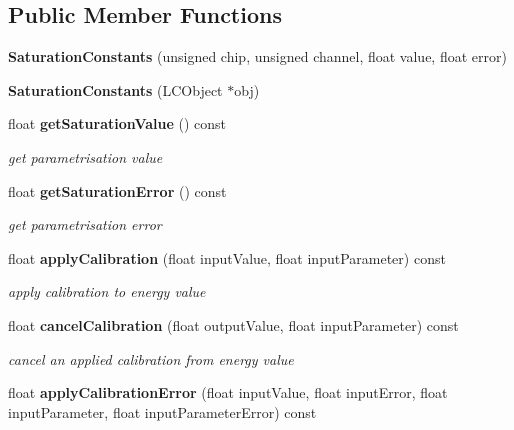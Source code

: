 \subsection*{Public Member Functions}
\begin{DoxyCompactItemize}
\item 
{\bfseries SaturationConstants} (unsigned chip, unsigned channel, float value, float error)\label{classCALICE_1_1SaturationConstants_ab78ca41a50dc74eddb2b82274dda4b96}

\item 
{\bfseries SaturationConstants} (LCObject $\ast$obj)\label{classCALICE_1_1SaturationConstants_a327dd2cc0ea1c5d5160e6693593d6587}

\item 
float {\bf getSaturationValue} () const \label{classCALICE_1_1SaturationConstants_a692c4d27fbada5699cb12c91c38653ab}

\begin{DoxyCompactList}\small\item\em get parametrisation value \item\end{DoxyCompactList}\item 
float {\bf getSaturationError} () const \label{classCALICE_1_1SaturationConstants_a9079460ba4174a3f95d12b0b647af98b}

\begin{DoxyCompactList}\small\item\em get parametrisation error \item\end{DoxyCompactList}\item 
float {\bf applyCalibration} (float inputValue, float inputParameter) const \label{classCALICE_1_1SaturationConstants_a9ffdaea1fa36d7f63483fa5438e870fc}

\begin{DoxyCompactList}\small\item\em apply calibration to energy value \item\end{DoxyCompactList}\item 
float {\bf cancelCalibration} (float outputValue, float inputParameter) const \label{classCALICE_1_1SaturationConstants_a551dcb6656eac067e5f88113eb443322}

\begin{DoxyCompactList}\small\item\em cancel an applied calibration from energy value \item\end{DoxyCompactList}\item 
float {\bf applyCalibrationError} (float inputValue, float inputError, float inputParameter, float inputParameterError) const \label{classCALICE_1_1SaturationConstants_a62846bb8c332310f5db4d2c31333ce11}


\end{DoxyCompactItemize}
